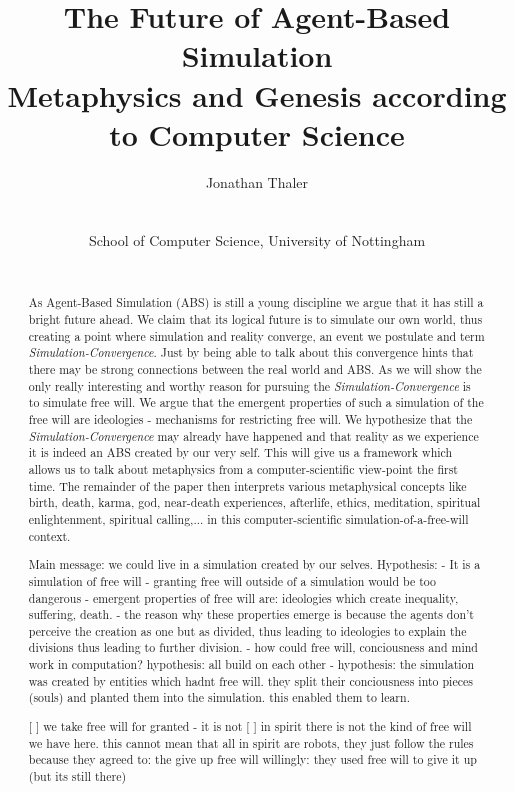 \documentclass[a4paper, 10pt, conference]{../../templates/IEEEconf/IEEEconf}
\title{The Future of Agent-Based Simulation \\ Metaphysics and Genesis according to Computer Science}
\author{
	Jonathan Thaler \\
	\email{jonathan.thaler@nottingham.ac.uk} \\
	\begin{affiliation}
		School of Computer Science, University of Nottingham
	\end{affiliation} \\
}
\begin{document}
\maketitle

\begin{abstract}
As Agent-Based Simulation (ABS) is still a young discipline we argue that it has still a bright future ahead. We claim that its logical future is to simulate our own world, thus creating a point where simulation and reality converge, an event we postulate and term \textit{Simulation-Convergence}. Just by being able to talk about this convergence hints that there may be strong connections between the real world and ABS. As we will show the only really interesting and worthy reason for pursuing the \textit{Simulation-Convergence} is to simulate free will. We argue that the emergent properties of such a simulation of the free will are ideologies - mechanisms for restricting free will. We hypothesize that the \textit{Simulation-Convergence} may already have happened and that reality as we experience it is indeed an ABS created by our very self. This will give us a framework which allows us to talk about metaphysics from a computer-scientific view-point the first time. The remainder of the paper then interprets various metaphysical concepts like birth, death, karma, god, near-death experiences, afterlife, ethics, meditation, spiritual enlightenment, spiritual calling,... in this computer-scientific simulation-of-a-free-will context.


Main message: we could live in a simulation created by our selves.
	Hypothesis: 
		- It is a simulation of free will 
		- granting free will outside of a simulation would be too dangerous
		- emergent properties of free will are: ideologies which create inequality, suffering, death. 
		- the reason why these properties emerge is because the agents don't perceive the creation as one but as divided, thus leading to ideologies to explain the divisions thus leading to further division.
		- how could free will, conciousness and mind work in computation? hypothesis: all build on each other
		- hypothesis: the simulation was created by entities which hadnt free will. they split their conciousness into pieces (souls) and planted them into the simulation. this enabled them to learn.

[ ] we take free will for granted - it is not
[ ] in spirit there is not the kind of free will we have here. this cannot mean that all in spirit are robots, they just follow the rules because they agreed to: the give up free will willingly: they used free will to give it up (but its still there)


\end{abstract}
\end{document}
